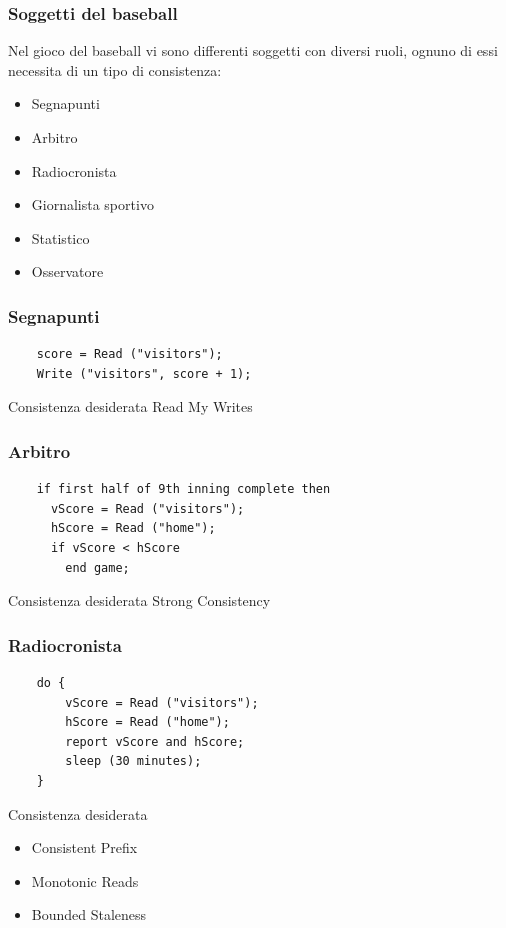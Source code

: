 \begin{frame}
 \frametitle{Soggetti del baseball}
 Nel gioco del baseball vi sono differenti soggetti con diversi ruoli, ognuno di essi necessita di un tipo di consistenza:
 \begin{itemize}
   \item Segnapunti
   \item Arbitro
   \item Radiocronista
   \item Giornalista sportivo
   \item Statistico
   \item Osservatore
 \end{itemize}
\end{frame}

\begin{frame}[fragile]
 \frametitle{Segnapunti}
  \begin{lstlisting}
    score = Read ("visitors");
    Write ("visitors", score + 1);
  \end{lstlisting}
  \begin{block}{Consistenza desiderata}
    Read My Writes
  \end{block}
\end{frame}

\begin{frame}[fragile]
 \frametitle{Arbitro}
  \begin{lstlisting}
    if first half of 9th inning complete then
      vScore = Read ("visitors");
      hScore = Read ("home");
      if vScore < hScore
        end game;
  \end{lstlisting}
 \begin{block}{Consistenza desiderata}
   Strong Consistency
 \end{block}
\end{frame}

\begin{frame}[fragile]
 \frametitle{Radiocronista}
  \begin{lstlisting}
    do {
        vScore = Read ("visitors");
        hScore = Read ("home");
        report vScore and hScore;
        sleep (30 minutes);
    }
  \end{lstlisting}
  \begin{block}{Consistenza desiderata}
    \begin{itemize}
      \item Consistent Prefix
      \item Monotonic Reads
      \item Bounded Staleness
    \end{itemize}
  \end{block}
\end{frame}

